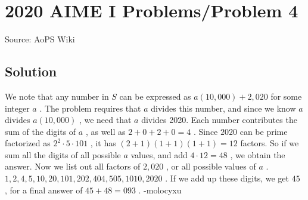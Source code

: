 \documentclass[12pt]{article}
\begin{document}
\section*{{2020 AIME I Problems/Problem 4}}
Source: AoPS Wiki

\subsection*{Solution}
We note that any number in $S$ can be expressed as $a(10,000) + 2,020$ for some integer $a$ . The problem requires that $a$ divides this number, and since we know $a$ divides $a(10,000)$ , we need that $a$ divides 2020. Each number contributes the sum of the digits of $a$ , as well as $2 + 0 + 2 +0 = 4$ . Since $2020$ can be prime factorized as $2^2 \cdot 5 \cdot 101$ , it has $(2+1)(1+1)(1+1) = 12$ factors. So if we sum all the digits of all possible $a$ values, and add $4 \cdot 12 = 48$ , we obtain the answer. Now we list out all factors of $2,020$ , or all possible values of $a$ . $1,2,4,5,10,20,101,202,404,505,1010,2020$ . If we add up these digits, we get $45$ , for a final answer of $45+48=\boxed{093}$ . -molocyxu
\end{document}
